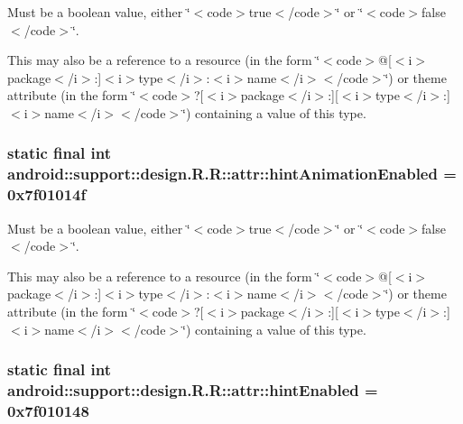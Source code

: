 Must be a boolean value, either \char`\"{}$<$code$>$true$<$/code$>$\char`\"{} or \char`\"{}$<$code$>$false$<$/code$>$\char`\"{}. 

This may also be a reference to a resource (in the form \char`\"{}$<$code$>$@\mbox{[}$<$i$>$package$<$/i$>$:\mbox{]}$<$i$>$type$<$/i$>$:$<$i$>$name$<$/i$>$$<$/code$>$\char`\"{}) or theme attribute (in the form \char`\"{}$<$code$>$?\mbox{[}$<$i$>$package$<$/i$>$:\mbox{]}\mbox{[}$<$i$>$type$<$/i$>$:\mbox{]}$<$i$>$name$<$/i$>$$<$/code$>$\char`\"{}) containing a value of this type. \hypertarget{classandroid_1_1support_1_1design_1_1_r_1_1attr_208e1ef93a15e91164d07d5ed8528f05}{
\subsubsection[{hintAnimationEnabled}]{\setlength{\rightskip}{0pt plus 5cm}static final int android::support::design.R.R::attr::hintAnimationEnabled = 0x7f01014f}}
\label{classandroid_1_1support_1_1design_1_1_r_1_1attr_208e1ef93a15e91164d07d5ed8528f05}


Must be a boolean value, either \char`\"{}$<$code$>$true$<$/code$>$\char`\"{} or \char`\"{}$<$code$>$false$<$/code$>$\char`\"{}. 

This may also be a reference to a resource (in the form \char`\"{}$<$code$>$@\mbox{[}$<$i$>$package$<$/i$>$:\mbox{]}$<$i$>$type$<$/i$>$:$<$i$>$name$<$/i$>$$<$/code$>$\char`\"{}) or theme attribute (in the form \char`\"{}$<$code$>$?\mbox{[}$<$i$>$package$<$/i$>$:\mbox{]}\mbox{[}$<$i$>$type$<$/i$>$:\mbox{]}$<$i$>$name$<$/i$>$$<$/code$>$\char`\"{}) containing a value of this type. \hypertarget{classandroid_1_1support_1_1design_1_1_r_1_1attr_6032f3f77c7fbbb92ed6d3ab342c2fab}{
\subsubsection[{hintEnabled}]{\setlength{\rightskip}{0pt plus 5cm}static final int android::support::design.R.R::attr::hintEnabled = 0x7f010148}}
\label{classandroid_1_1support_1_1design_1_1_r_1_1attr_6032f3f77c7fbbb92ed6d3ab342c2fab}


